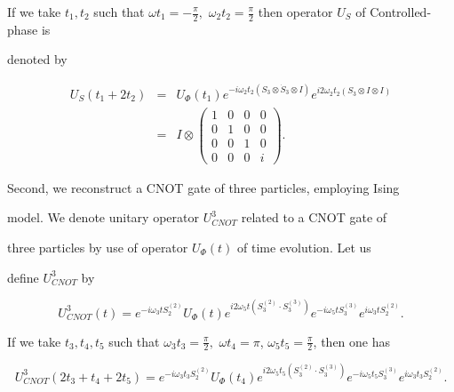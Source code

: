 If we take $t_{1},t_{2}$ such that $\omega t_{1}=-\frac{\pi }{2},$ $\omega

_{2}t_{2}=\frac{\pi }{2}$ then operator $U_{S}$ of Controlled-phase is

denoted by 

\[

\begin{array}{lll}

U_{S}(t_{1}+2t_{2}) & = & U_{\Phi }(t_{1})e^{-i\omega _{2}t_{2}(S_{3}\otimes 

\dot{S}_{3}\otimes I)}e^{i2\omega _{2}t_{2}(S_{3}\otimes I\otimes I)} \\ 

& = & I\otimes \left( 

\begin{array}{llll}

1 & 0 & 0 & 0 \\ 

0 & 1 & 0 & 0 \\ 

0 & 0 & 1 & 0 \\ 

0 & 0 & 0 & i%

\end{array}%

\right) .

\end{array}%

\]%

Second, we reconstruct a CNOT gate of three particles, employing Ising

model. We denote unitary operator $U_{CNOT}^{3}$ related to a CNOT gate of

three particles by use of operator $U_{\Phi }(t)$ of time evolution. Let us

define $U_{CNOT}^{3}$ by 

\[

U_{CNOT}^{3}(t)=e^{-i\omega _{3}tS_{2}^{(2)}}U_{\Phi }(t)e^{i2\omega

_{5}t(S_{3}^{(2)}\cdot S_{3}^{(3)})}e^{-i\omega _{5}tS_{3}^{(3)}}e^{i\omega

_{3}tS_{2}^{(2)}}.

\]%

If we take $t_{3},t_{4},t_{5}$ such that $\omega _{3}t_{3}=\frac{\pi }{2}%

,$ $\omega t_{4}=\pi$, $\omega _{5}t_{5}=\frac{\pi }{2}$, then one has 

\[

U_{CNOT}^{3}(2t_{3}+t_{4}+2t_{5})=e^{-i\omega _{3}t_{3}S_{2}^{(2)}}U_{\Phi

}(t_{4})e^{i2\omega _{5}t_{5}(S_{3}^{(2)}\cdot S_{3}^{(3)})}e^{-i\omega

_{5}t_{5}S_{3}^{(3)}}e^{i\omega _{3}t_{3}S_{2}^{(2)}}.

\]%

